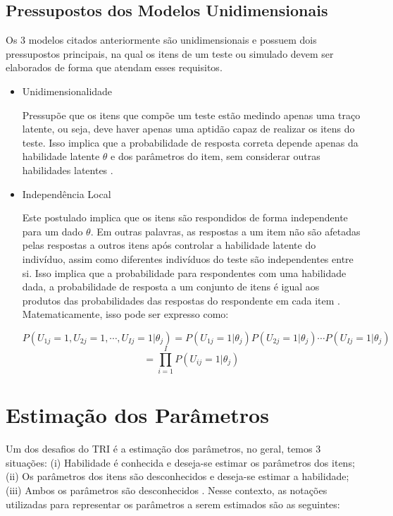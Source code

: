 \subsection{Pressupostos dos Modelos Unidimensionais}

Os 3 modelos citados anteriormente são unidimensionais e possuem dois pressupostos principais, na qual os itens de um teste ou simulado devem ser elaborados de forma que atendam esses requisitos. 

\begin{itemize}
	
\item  Unidimensionalidade

Pressupõe que os itens que compõe um teste estão medindo apenas uma traço latente, ou seja, deve haver apenas uma aptidão capaz de realizar os itens do teste. Isso implica que a probabilidade de resposta correta depende apenas da habilidade latente $\theta$ e dos parâmetros do item, sem considerar outras habilidades latentes \cite{pasquali1996}.

\item  Independência Local

Este postulado implica que os itens são respondidos de forma independente para um dado $\theta$. Em outras palavras, as respostas a um item não são afetadas pelas respostas a outros itens após controlar a habilidade latente do indivíduo, assim como diferentes indivíduos do teste são independentes entre si. Isso implica que a probabilidade para respondentes com uma habilidade dada, a probabilidade de resposta a um conjunto de itens é igual aos produtos das probabilidades das respostas do respondente em cada item \cite{pasquali1996}. Matematicamente, isso pode ser expresso como:


\[
 P(U_{1j} = 1, U_{2j} = 1, \cdots, U_{Ij} = 1 |\theta_j) = 
 P(U_{1j} = 1|\theta_j)  P(U_{2j} = 1|\theta_j) \cdots P(U_{Ij} = 1|\theta_j) 
\] 
\[
 = \prod_{i=1}^{I}P(U_{ij} = 1|\theta_j) 
\]

\end{itemize}
\section{Estimação dos Parâmetros}



Um dos desafios do TRI é a estimação dos parâmetros, no geral, temos 3 situações:  (i) Habilidade é conhecida e deseja-se estimar os parâmetros dos itens; (ii) Os parâmetros dos itens são desconhecidos e deseja-se estimar a habilidade; (iii) Ambos os parâmetros são desconhecidos \cite{de2000teoria}.  Nesse contexto, as notações utilizadas para representar os parâmetros a serem estimados são as seguintes:\\


